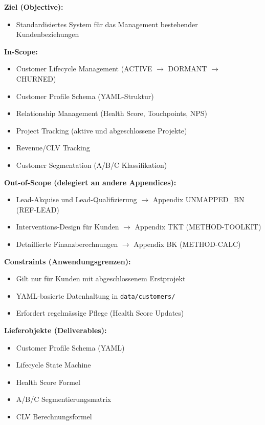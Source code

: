 \begin{tcolorbox}[
    colback=orange!5!white,
    colframe=orange!75!black,
    title={\textbf{Appendix Scope: Ziel / In-Scope / Out-of-Scope / Constraints}},
    fonttitle=\bfseries
]

\textbf{Ziel (Objective):}
\begin{itemize}[nosep]
    \item Standardisiertes System für das Management bestehender Kundenbeziehungen
\end{itemize}

\textbf{In-Scope:}
\begin{itemize}[nosep]
    \item Customer Lifecycle Management (ACTIVE $\rightarrow$ DORMANT $\rightarrow$ CHURNED)
    \item Customer Profile Schema (YAML-Struktur)
    \item Relationship Management (Health Score, Touchpoints, NPS)
    \item Project Tracking (aktive und abgeschlossene Projekte)
    \item Revenue/CLV Tracking
    \item Customer Segmentation (A/B/C Klassifikation)
\end{itemize}

\textbf{Out-of-Scope (delegiert an andere Appendices):}
\begin{itemize}[nosep]
    \item Lead-Akquise und Lead-Qualifizierung $\rightarrow$ Appendix UNMAPPED_BN (REF-LEAD)
    \item Interventions-Design für Kunden $\rightarrow$ Appendix TKT (METHOD-TOOLKIT)
    \item Detaillierte Finanzberechnungen $\rightarrow$ Appendix BK (METHOD-CALC)
\end{itemize}

\textbf{Constraints (Anwendungsgrenzen):}
\begin{itemize}[nosep]
    \item Gilt nur für Kunden mit abgeschlossenem Erstprojekt
    \item YAML-basierte Datenhaltung in \texttt{data/customers/}
    \item Erfordert regelmässige Pflege (Health Score Updates)
\end{itemize}

\textbf{Lieferobjekte (Deliverables):}
\begin{itemize}[nosep]
    \item Customer Profile Schema (YAML)
    \item Lifecycle State Machine
    \item Health Score Formel
    \item A/B/C Segmentierungsmatrix
    \item CLV Berechnungsformel
\end{itemize}

\end{tcolorbox}


